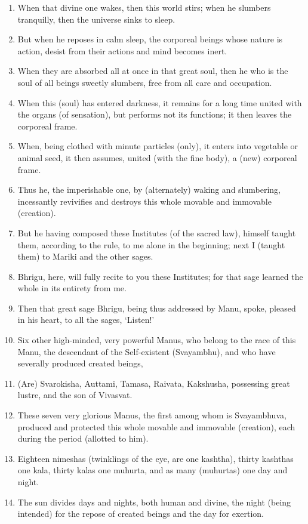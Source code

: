 \begin{enumerate}
\item When that divine one wakes, then this world stirs; when he slumbers tranquilly, then the universe sinks to sleep.
\item But when he reposes in calm sleep, the corporeal beings whose nature is action, desist from their actions and mind becomes inert.
\item When they are absorbed all at once in that great soul, then he who is the soul of all beings sweetly slumbers, free from all care and occupation.
\item When this (soul) has entered darkness, it remains for a long time united with the organs (of sensation), but performs not its functions; it then leaves the corporeal frame.
\item When, being clothed with minute particles (only), it enters into vegetable or animal seed, it then assumes, united (with the fine body), a (new) corporeal frame.
\item Thus he, the imperishable one, by (alternately) waking and slumbering, incessantly revivifies and destroys this whole movable and immovable (creation).
\item But he having composed these Institutes (of the sacred law), himself taught them, according to the rule, to me alone in the beginning; next I (taught them) to Mariki and the other sages.
\item Bhrigu, here, will fully recite to you these Institutes; for that sage learned the whole in its entirety from me.
\item Then that great sage Bhrigu, being thus addressed by Manu, spoke, pleased in his heart, to all the sages, `Listen!'
\item Six other high-minded, very powerful Manus, who belong to the race of this Manu, the descendant of the Self-existent (Svayambhu), and who have severally produced created beings,
\item (Are) Svarokisha, Auttami, Tamasa, Raivata, Kakshusha, possessing great lustre, and the son of Vivasvat.
\item These seven very glorious Manus, the first among whom is Svayambhuva, produced and protected this whole movable and immovable (creation), each during the period (allotted to him).
\item Eighteen nimeshas (twinklings of the eye, are one kashtha), thirty kashthas one kala, thirty kalas one muhurta, and as many (muhurtas) one day and night.
\item The sun divides days and nights, both human and divine, the night (being intended) for the repose of created beings and the day for exertion.

\end{enumerate}
